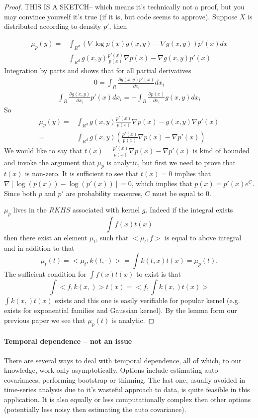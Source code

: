 \documentclass{article}
\begin{document}
\begin{proof}
THIS IS A SKETCH-- which means it's technically not a proof, but you may convince yourself it's true (if it is, but code seems to approve).
 Suppose $X$ is distributed according to density $p'$, then

\begin{align}
\mu_p(y) =& \int_{R^d} ( \nabla \log p(x) g(x,y) -  \nabla g(x,y)) p'(x) dx \\
          & \int_{R^d} g(x,y) \frac{ p'(x)}{p(x)} \nabla p(x) - \nabla g(x,y) p'(x)  
\end{align}
Integration by parts and shows that for all partial derivatives 
\begin{align}
0 = \int_{R} \frac{ \partial g(x,y)p'(x)} { \partial x_i } dx_i
\end{align}
\begin{align} 
 \int_{R} \frac{ \partial g(x,y) } { \partial x_i } p'(x) d x_i =
 -\int_{R} \frac{ \partial p(x) } { \partial x_i } g(x,y) d x_i 
\end{align}
So
\begin{align}
\mu_p(y) =& \int_{R^d} g(x,y) \frac{ p'(x)}{p(x)} \nabla p(x) -  g(x,y) \nabla p'(x)  \\
	 =& \int_{R^d} g(x,y) \left( \frac{ p'(x)}{p(x) } \nabla p(x) -  \nabla p'(x) \right)
\end{align}
 We would like to say that $t(x) = \frac{ p'(x)}{p(x) } \nabla p(x) -  \nabla p'(x)$  is kind of bounded and invoke the argument that $\mu_p$ is analytic, but first we need to prove that $t(x)$ is non-zero. 
 It is sufficient to see that $t(x) =0$ implies that $\nabla [ \log( p(x)) - \log( p'(x)) ]=0$, which implies that $p(x) = p'(x)e^C$. Since both $p$ and $p'$ are probability measures,  $C$ must be equal to 0.
 
 $\mu_p$ lives in the $RKHS$ associated with kernel $g$. Indeed if the integral exists 
 \[
  \int f(x) t(x) 
 \]
 then there exist an element $\mu_t$, such that $<\mu_t, f>$ is equal to above integral and in addition to that 
 \[
  \mu_t(t) = < \mu_t, k(t,\cdot)> = \int k(t,x) t(x) = \mu_p(t). 
 \]
The sufficient condition for $\int f(x) t(x)$ to exist is that 
\[
 \int <f, k(x,)> t(x) = < f, \int k(x,) t(x) > 
\]
$\int k(x,) t(x) $ exists and this one is easily verifiable for popular kernel (e.g. exists for exponential families and Gaussian kernel). By the lemma form our previous paper we see that $\mu_p(t)$ is  analytic. 
\end{proof}

\paragraph{Temporal dependence -- not an issue}
There are several ways to deal with temporal dependence, all of which, to our knowledge, work only asymptotically. Options include estimating auto-covariances, performing bootstrap or thinning. The last one, usually avoided in time-series analysis due to it's wasteful approach to data, is quite feasible in this application. It is also equally or less computationally complex then other options (potentially less noisy then estimating the auto covariance).      
\end{document}
